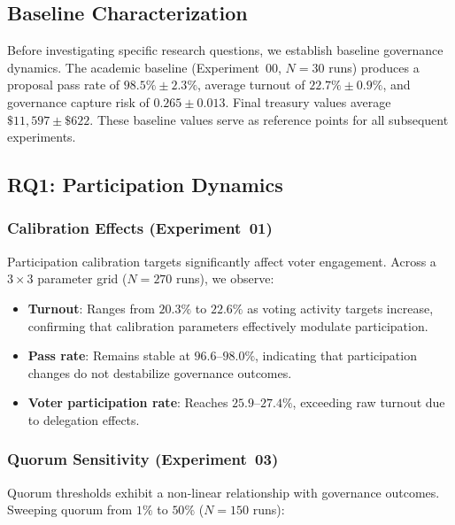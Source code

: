 
\subsection{Baseline Characterization}

Before investigating specific research questions, we establish baseline governance dynamics. The academic baseline (Experiment~00, $N=30$ runs) produces a proposal pass rate of $98.5\% \pm 2.3\%$, average turnout of $22.7\% \pm 0.9\%$, and governance capture risk of $0.265 \pm 0.013$. Final treasury values average $\$11{,}597 \pm \$622$. These baseline values serve as reference points for all subsequent experiments.

\subsection{RQ1: Participation Dynamics}

\subsubsection{Calibration Effects (Experiment~01)}

Participation calibration targets significantly affect voter engagement. Across a $3 \times 3$ parameter grid ($N=270$ runs), we observe:

\begin{itemize}
    \item \textbf{Turnout}: Ranges from $20.3\%$ to $22.6\%$ as voting activity targets increase, confirming that calibration parameters effectively modulate participation.
    \item \textbf{Pass rate}: Remains stable at $96.6$--$98.0\%$, indicating that participation changes do not destabilize governance outcomes.
    \item \textbf{Voter participation rate}: Reaches $25.9$--$27.4\%$, exceeding raw turnout due to delegation effects.
\end{itemize}

\subsubsection{Quorum Sensitivity (Experiment~03)}

Quorum thresholds exhibit a non-linear relationship with governance outcomes. Sweeping quorum from $1\%$ to $50\%$ ($N=150$ runs):

